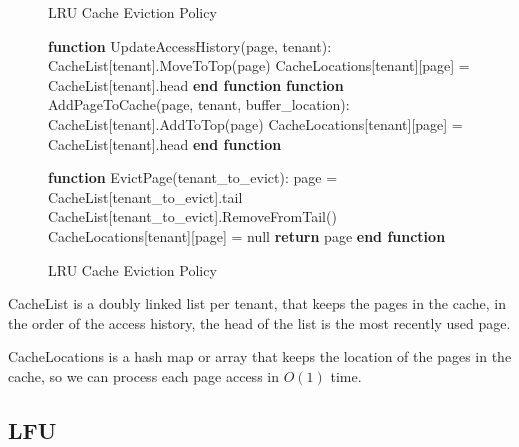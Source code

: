 \begin{figure}[htbp]
    \centering
    \begin{minipage}{\linewidth}
    \begin{algorithm}[H]
        \caption{LRU Cache Eviction Policy}
        \begin{algorithmic}
            \STATE \textbf{function} UpdateAccessHistory(page, tenant):
            \STATE \hspace{\algorithmicindent} CacheList[tenant].MoveToTop(page)
            \STATE \hspace{\algorithmicindent} CacheLocations[tenant][page] = CacheList[tenant].head
            \STATE \textbf{end function}
            \STATE
            \STATE \textbf{function} AddPageToCache(page, tenant, buffer\_location):
            \STATE \hspace{\algorithmicindent} CacheList[tenant].AddToTop(page)
            \STATE \hspace{\algorithmicindent} CacheLocations[tenant][page] = CacheList[tenant].head
            \STATE \textbf{end function}

            \STATE
            \STATE \textbf{function} EvictPage(tenant\_to\_evict):
            \STATE \hspace{\algorithmicindent} page = CacheList[tenant\_to\_evict].tail
            \STATE \hspace{\algorithmicindent} CacheList[tenant\_to\_evict].RemoveFromTail()
            \STATE \hspace{\algorithmicindent} CacheLocations[tenant][page] = null
            \STATE \hspace{\algorithmicindent} \textbf{return} page
            \STATE \textbf{end function}
        \end{algorithmic}
    \end{algorithm}
    \caption{LRU Cache Eviction Policy}
    \label{fig:lru}
    \end{minipage}
\end{figure}

CacheList is a doubly linked list per tenant, that keeps the pages in the cache,
in the order of the access history, the head of the list is the most recently used
page.

CacheLocations is a hash map or array that keeps the location of the pages in the cache,
so we can process each page access in $O(1)$ time.

\subsection{LFU}

